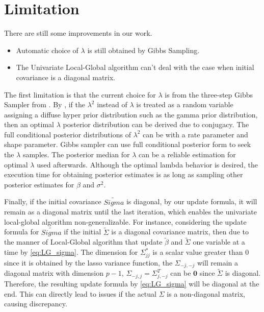 %
%


\label{Chapter5}
\section{Limitation}
There are still some improvements in our work.


\begin{itemize}
	\item Automatic choice of $\lambda$ is still obtained by Gibbs Sampling.
	\item The Univariate Local-Global algorithm can't deal with the case when initial covariance is a diagonal matrix. 
\end{itemize}
The first limitation is that the current choice for $\lambda$ is from the three-step Gibbs Sampler from \cite{park_casella_2008}. By \cite{park_casella_2008}, if the $\lambda^2$ instead of $\lambda$ is treated as a random variable assigning a diffuse hyper prior distribution such as the gamma prior distribution, then an optimal $\lambda$ posterior distribution can be derived due to conjugacy. The full conditional posterior distributions of $\lambda^2$ can be with a rate parameter and shape parameter. Gibbs sampler can use full conditional posterior form to seek the $\lambda$ samples. The posterior median for $\lambda$ can be a reliable estimation for optimal $\lambda$ used afterwards. Although the optimal lambda behavior is desired, the execution time for obtaining posterior estimates is as long as sampling other posterior estimates for $\beta$ and $\sigma^2$.

Finally, if the initial covariance $\tilde{Sigma}$ is diagonal, by our update formula, it will remain as a diagonal matrix until the last iteration, which enables the univariate local-global algorithm non-generalizable.
For instance, considering the update formula for $\tilde{Sigma}$ if the initial $\tilde{\Sigma}$ is a diagonal covariance matrix, then 
due to the manner of Local-Global algorithm that update $\tilde{\beta}$ and $\tilde{\Sigma}$ one variable at a time by \autoref{eq:LG_sigma}. The dimension for $\Sigma_{jj}^{*}$ is a scalar value greater than 0 since it is obtained by the lasso variance function, the $\Sigma_{-j,-j}$ will remain a diagonal matrix with dimension $p-1$, $\Sigma_{-j,j} = \Sigma_{j,-j}^T$ can be $\mathbf{0}$ since $\tilde{\Sigma}$ is diagonal. Therefore, the resulting update formula by \autoref{eq:LG_sigma} will be diagonal at the end. This can directly lead to issues if the actual $\Sigma$ is a non-diagonal matrix, causing discrepancy.

